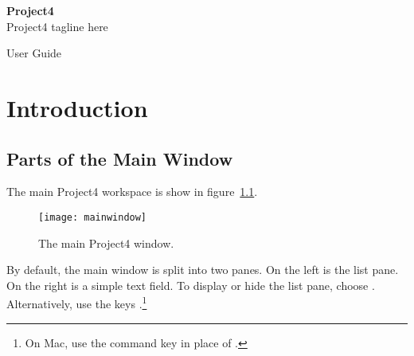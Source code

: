 \documentclass[11pt,fleqn]{book} %
\begin{document}

\begingroup
\thispagestyle{empty}
\centering
\vspace*{5cm}
\par\normalfont\fontsize{35}{35}\sffamily\selectfont
\textbf{Project4}\\
{\LARGE Project4 tagline here}\par %
\vspace*{1cm}
{\Huge User Guide}\par %
\endgroup


\thispagestyle{empty}
\tableofcontents %


\chapter{Introduction}
\thispagestyle{empty}

\section{Parts of the Main Window}
The main Project4 workspace is show in figure~\ref{fig:mainwindow}.

\begin{figure}[h]
  \centering
  \texttt{[image: mainwindow]}
  \caption{The main Project4 window.\label{fig:mainwindow}}
\end{figure}

By default, the main window is split into two panes.
On the left is the list pane.
On the right is a simple text field.
To display or hide the list pane, choose .
Alternatively, use the keys .\footnote{On Mac,
use the command key \keys{\cmd} in place of \keys{\ctrl}.}
\end{document}
